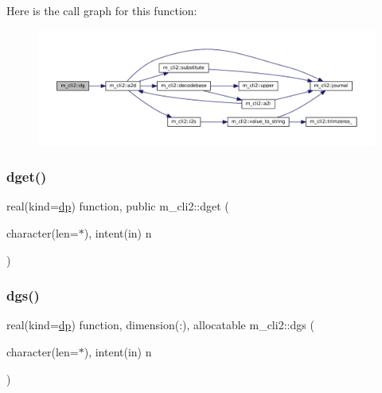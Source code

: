 Here is the call graph for this function\+:
\nopagebreak
\begin{figure}[H]
\begin{center}
\leavevmode
\includegraphics[width=350pt]{namespacem__cli2_a06ddc2533e5122b8f898bae7db0fea87_cgraph}
\end{center}
\end{figure}
\mbox{\label{namespacem__cli2_abb63058af19a47e19a78567c4a320c16}} 
\subsubsection{\texorpdfstring{dget()}{dget()}}
{\footnotesize\ttfamily real(kind=\mbox{\hyperlink{namespacem__cli2_acf83f1963cf6a56ad0221cfcf5402440}{dp}}) function, public m\+\_\+cli2\+::dget (\begin{DoxyParamCaption}\item[{character(len=$\ast$), intent(in)}]{n }\end{DoxyParamCaption})}

\mbox{\label{namespacem__cli2_a84bc83f5e8ec87f4d691e40df7569c83}} 
\subsubsection{\texorpdfstring{dgs()}{dgs()}}
{\footnotesize\ttfamily real(kind=\mbox{\hyperlink{namespacem__cli2_acf83f1963cf6a56ad0221cfcf5402440}{dp}}) function, dimension(\+:), allocatable m\+\_\+cli2\+::dgs (\begin{DoxyParamCaption}\item[{character(len=$\ast$), intent(in)}]{n }\end{DoxyParamCaption})\hspace{0.3cm}{\ttfamily [private]}}

\mbox{\label{namespacem__cli2_a601a06b7038b524abababc8d437ee823}} 
